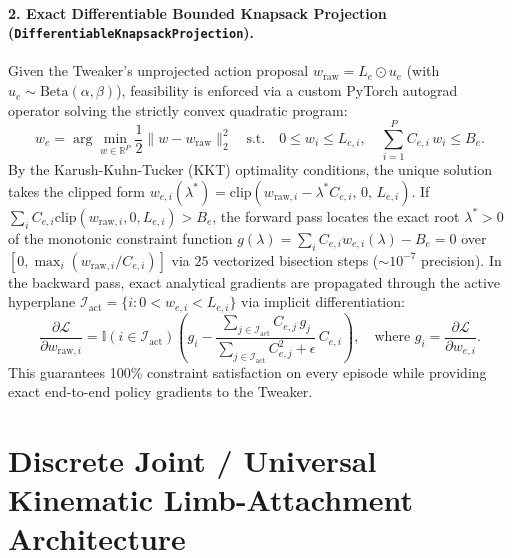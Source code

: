 \documentclass[11pt,a4paper]{article}
\begin{document}
\paragraph{2. Exact Differentiable Bounded Knapsack Projection (\texttt{DifferentiableKnapsackProjection}).}
Given the Tweaker's unprojected action proposal $w_{\text{raw}} = L_e \odot u_e$ (with $u_e \sim \text{Beta}(\alpha, \beta)$), feasibility is enforced via a custom PyTorch autograd operator solving the strictly convex quadratic program:
\begin{equation}
    w_e = \arg\min_{w \in \mathbb{R}^P} \frac{1}{2}\|w - w_{\text{raw}}\|_2^2 \quad \text{s.t.} \quad 0 \le w_i \le L_{e,i}, \quad \sum_{i=1}^P C_{e,i}\, w_i \le B_e.
\end{equation}
By the Karush-Kuhn-Tucker (KKT) optimality conditions, the unique solution takes the clipped form $w_{e,i}(\lambda^*) = \text{clip}(w_{\text{raw},i} - \lambda^* C_{e,i},\, 0,\, L_{e,i})$. If $\sum_i C_{e,i} \text{clip}(w_{\text{raw},i}, 0, L_{e,i}) > B_e$, the forward pass locates the exact root $\lambda^* > 0$ of the monotonic constraint function $g(\lambda) = \sum_i C_{e,i} w_{e,i}(\lambda) - B_e = 0$ over $[0, \max_i(w_{\text{raw},i}/C_{e,i})]$ via $25$ vectorized bisection steps ($\sim 10^{-7}$ precision). In the backward pass, exact analytical gradients are propagated through the active hyperplane $\mathcal{I}_{\text{act}} = \{i : 0 < w_{e,i} < L_{e,i}\}$ via implicit differentiation:
\begin{equation}
    \frac{\partial \mathcal{L}}{\partial w_{\text{raw},i}} = \mathbb{I}(i \in \mathcal{I}_{\text{act}})\!\left(g_i - \frac{\sum_{j \in \mathcal{I}_{\text{act}}} C_{e,j}\, g_j}{\sum_{j \in \mathcal{I}_{\text{act}}} C_{e,j}^2 + \epsilon}\, C_{e,i}\right), \quad \text{where } g_i = \frac{\partial \mathcal{L}}{\partial w_{e,i}}.
\end{equation}
This guarantees 100\% constraint satisfaction on every episode while providing exact end-to-end policy gradients to the Tweaker.

\section{Discrete Joint / Universal Kinematic Limb-Attachment Architecture}
\label{sec:limb}
\end{document}
